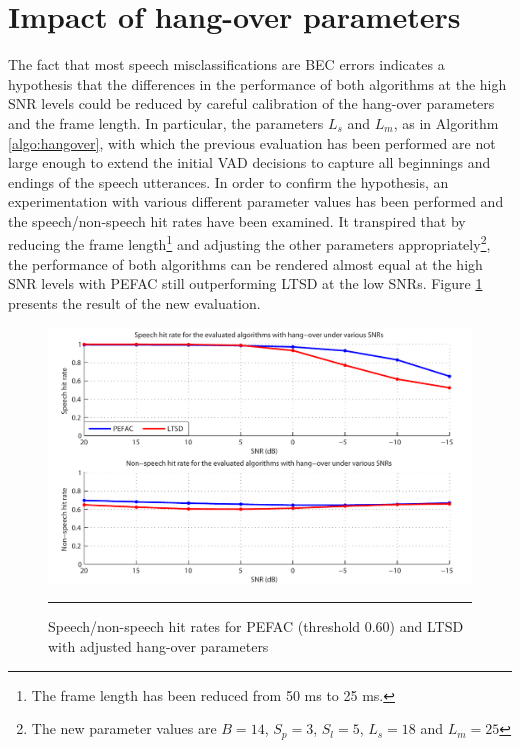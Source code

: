 \section{Impact of hang-over parameters}

The fact that most speech misclassifications are BEC errors indicates a hypothesis that the differences in the performance of both algorithms at the high SNR levels could be reduced by careful calibration of the hang-over parameters and the frame length. In particular, the parameters $L_s$ and $L_m$, as in Algorithm \ref{algo:hangover}, with which the previous evaluation has been performed are not large enough to extend the initial VAD decisions to capture all beginnings and endings of the speech utterances. In order to confirm the hypothesis, an experimentation with various different parameter values has been performed and the speech/non-speech hit rates have been examined. It transpired that by reducing the frame length\footnote{The frame length has been reduced from 50 ms to 25 ms.} and adjusting the other parameters appropriately\footnote{The new parameter values are $B=14$, $S_p=3$, $S_l=5$, $L_s=18$ and $L_m=25$}, the performance of both algorithms can be rendered almost equal at the high SNR levels with PEFAC still outperforming LTSD at the low SNRs. Figure \ref{fig:diffhangpars} presents the result of the new evaluation.

\begin{figure}[htbp]
	\centering
		\includegraphics[width=0.9\columnwidth]{Figures/Chapter5/diffhangpars.pdf}
		\rule{37em}{0.5pt}
	\caption[Speech/non-speech hit rates for PEFAC (threshold 0.60) and LTSD with adjusted hang-over parameters]{Speech/non-speech hit rates for PEFAC (threshold 0.60) and LTSD with adjusted hang-over parameters}
	\label{fig:diffhangpars}
\end{figure}

